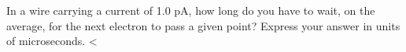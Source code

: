         In a wire carrying a current of 1.0 pA, how long do
        you have to wait, on the average, for the next electron to
        pass a given point? Express your answer in units of microseconds.
        <%
